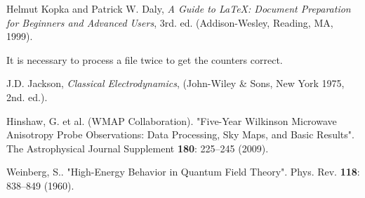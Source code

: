 \documentclass[twocolumn]{revtex4}
\begin{document}
\begin{thebibliography}{99}

Helmut Kopka and Patrick W. Daly, \textsl{A Guide to
\LaTeX: Document Preparation for Beginners and Advanced Users}, 3rd. ed. (Addison-Wesley, Reading, MA, 1999).

 It is necessary to process a file twice to
get the counters correct.

 J.D. Jackson, {\it Classical Electrodynamics}, (John-Wiley
\& Sons, New York 1975, 2nd. ed.).


 Hinshaw, G. et al. (WMAP Collaboration).
"Five-Year Wilkinson Microwave Anisotropy Probe Observations:
Data Processing, Sky Maps, and Basic Results".
The Astrophysical Journal Supplement {\bf 180}: 225–245 (2009).

 Weinberg, S.. "High-Energy Behavior in Quantum
Field Theory". Phys. Rev. {\bf 118}: 838–849 (1960).


\end{thebibliography}
\end{document}
